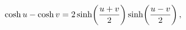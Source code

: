 \[\mathop{\cosh\/}\nolimits u-\mathop{\cosh\/}\nolimits v=2\mathop{\sinh\/}%
\nolimits\!\left(\frac{u+v}{2}\right)\mathop{\sinh\/}\nolimits\!\left(\frac{u-%
v}{2}\right),\]